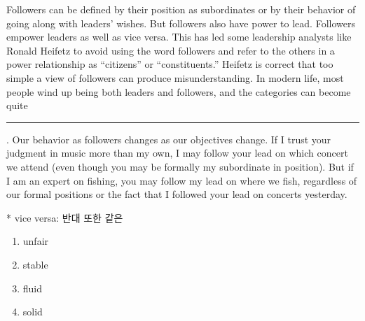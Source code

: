 \documentclass[a4paper, twocolumn]{oblivoir}
\begin{document}
\begin{enumerate}
                Followers can be defined by their position as subordinates
        or by their behavior of going along with leaders’ wishes. But
        followers also have power to lead. Followers empower
        leaders as well as vice versa. This has led some leadership
        analysts like Ronald Heifetz to avoid using the word
        followers and refer to the others in a power relationship as
        “citizens” or “constituents.” Heifetz is correct that too simple
        a view of followers can produce misunderstanding. In modern
        life, most people wind up being both leaders and followers,
        and the categories can become quite \rule{1cm}{0.1mm}. Our behavior
        as followers changes as our objectives change. If I trust
        your judgment in music more than my own, I may follow
        your lead on which concert we attend (even though you may
        be formally my subordinate in position). But if I am an
        expert on fishing, you may follow my lead on where we
        fish, regardless of our formal positions or the fact that I
        followed your lead on concerts yesterday.
        \begin{flushright}
            \small{* vice versa: 반대 또한 같은}     
        \end{flushright}
        \begin{enumerate}
            \item unfair
            \item stable
            \item fluid
            \item solid
        \end{enumerate}
    \end{enumerate}
\end{document}
